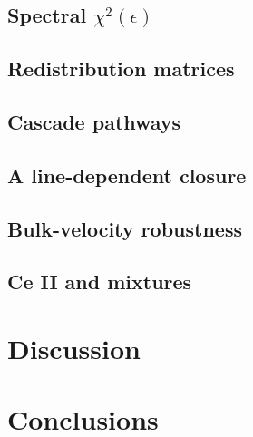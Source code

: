 \documentclass[fleqn,usenatbib]{mnras}
\begin{document}
\subsection{Spectral $\chi^2(\epsilon)$}          %
\subsection{Redistribution matrices}              %
\subsection{Cascade pathways}                     %
\subsection{A line-dependent closure}             %
\subsection{Bulk-velocity robustness}             %
\subsection{Ce II and mixtures}                   %

\section{Discussion}

\section{Conclusions}



\end{document}
